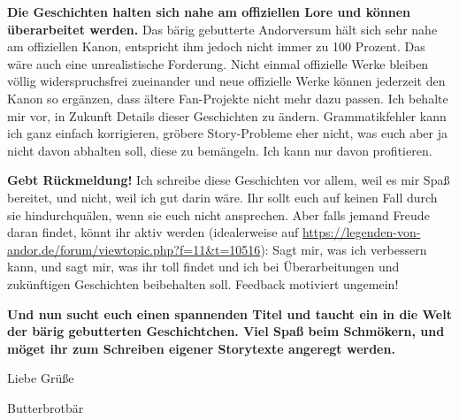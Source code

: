 \textbf{Die Geschichten halten sich nahe am offiziellen Lore und können überarbeitet werden.}
Das bärig gebutterte Andorversum hält sich sehr nahe am offiziellen Kanon, entspricht ihm jedoch nicht immer zu 100 Prozent. Das wäre auch eine unrealistische Forderung. Nicht einmal offizielle Werke bleiben völlig widerspruchsfrei zueinander und neue offizielle Werke können jederzeit den Kanon so ergänzen, dass ältere Fan-Projekte nicht mehr dazu passen. Ich behalte mir vor, in Zukunft Details dieser Geschichten zu ändern. Grammatikfehler kann ich ganz einfach korrigieren, gröbere Story-Probleme eher nicht, was euch aber ja nicht davon abhalten soll, diese zu bemängeln. Ich kann nur davon profitieren.
\bigskip

\textbf{Gebt Rückmeldung!} 
Ich schreibe diese Geschichten vor allem, weil es mir Spaß bereitet, und nicht, weil ich gut darin wäre. Ihr sollt euch auf keinen Fall durch sie hindurchquälen, wenn sie euch nicht ansprechen. Aber falls jemand Freude daran findet, könnt ihr aktiv werden (idealerweise auf \url{https://legenden-von-andor.de/forum/viewtopic.php?f=11&t=10516}): Sagt mir, was ich verbessern kann, und sagt mir, was ihr toll findet und ich bei Überarbeitungen und zukünftigen Geschichten beibehalten soll.
Feedback motiviert ungemein!
\bigskip

\textbf{Und nun sucht euch einen spannenden Titel und taucht ein in die Welt der bärig gebutterten Geschichtchen. Viel Spaß beim Schmökern, und möget ihr zum Schreiben eigener Storytexte angeregt werden.}
\bigskip


Liebe Grüße

Butterbrotbär
